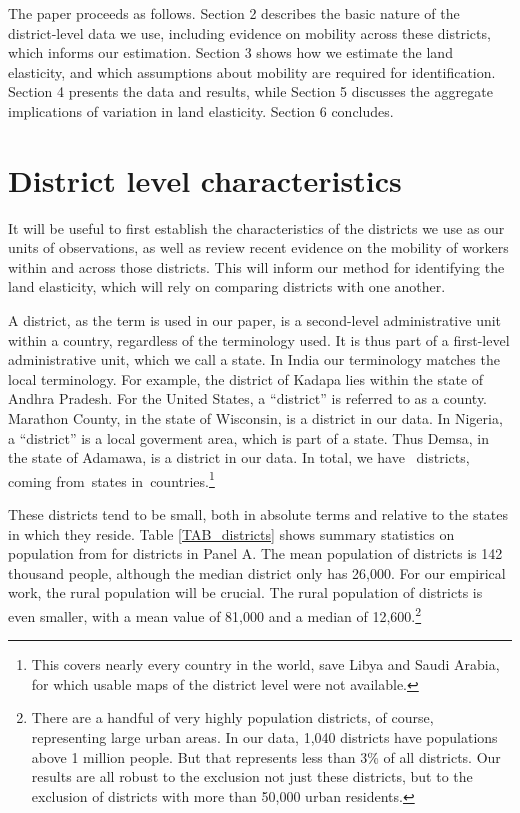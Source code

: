 \documentclass[11pt]{article}
\begin{document}
The paper proceeds as follows. Section 2 describes the basic nature of the district-level data we use, including evidence on mobility across these districts, which informs our estimation. Section 3 shows how we estimate the land elasticity, and which assumptions about mobility are required for identification. Section 4 presents the data and results, while Section 5 discusses the aggregate implications of variation in land elasticity. Section 6 concludes.

\section{District level characteristics}
It will be useful to first establish the characteristics of the districts we use as our units of observations, as well as review recent evidence on the mobility of workers within and across those districts. This will inform our method for identifying the land elasticity, which will rely on comparing districts with one another.

A district, as the term is used in our paper, is a second-level administrative unit within a country, regardless of the terminology used. It is thus part of a first-level administrative unit, which we call a state. In India our terminology matches the local terminology. For example, the district of Kadapa lies within the state of Andhra Pradesh. For the United States, a ``district'' is referred to as a county. Marathon County, in the state of Wisconsin, is a district in our data. In Nigeria, a ``district'' is a local goverment area, which is part of a state. Thus Demsa, in the state of Adamawa, is a district in our data. In total, we have \districts \ districts, coming from\provinces \ states in\countries \ countries.\footnote{This covers nearly every country in the world, save Libya and Saudi Arabia, for which usable maps of the district level were not available.}

These districts tend to be small, both in absolute terms and relative to the states in which they reside. Table \ref{TAB_districts} shows summary statistics on population from \cite{hyde31} for districts in Panel A. The mean population of districts is 142 thousand people, although the median district only has 26,000. For our empirical work, the rural population will be crucial. The rural population of districts is even smaller, with a mean value of 81,000 and a median of 12,600.\footnote{There are a handful of very highly population districts, of course, representing large urban areas. In our data, 1,040 districts have populations above 1 million people. But that represents less than 3\% of all districts. Our results are all robust to the exclusion not just these districts, but to the exclusion of districts with more than 50,000 urban residents.}
\end{document}
